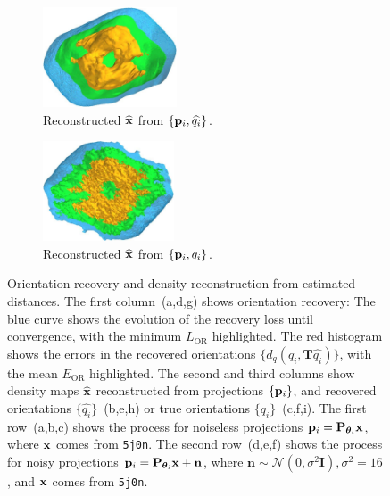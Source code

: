 \begin{figure}[t]
    \hfill
    \begin{subfigure}[b]{0.26\linewidth}
        \centering
        \includegraphics[height=8em]{figures/5a1a_aligned}
        \caption{Reconstructed $\widehat{\mathbf{x}}$ from $\{ \mathbf{p}_i, \widehat{q_i} \}$.}%
        \label{fig:5a1a-noise0-reconstruction-recovered}
    \end{subfigure}
    \hfill
    \begin{subfigure}[b]{0.26\linewidth}
        \centering
        \includegraphics[height=8em]{figures/5a1a_ground_truth}
        \caption{Reconstructed $\widehat{\mathbf{x}}$ from $\{ \mathbf{p}_i, q_i \}$.}%
        \label{fig:5a1a-noise0-reconstruction-true}
    \end{subfigure}
    \caption{%
        Orientation recovery and density reconstruction from estimated distances.
        The first column~(a,d,g) shows orientation recovery:
        The blue curve shows the evolution of the recovery loss until convergence, with the minimum $L_\text{OR}$  highlighted.
        The red histogram shows the errors in the recovered orientations $\{d_q(q_i, \mathbf{T}\widehat{q_i})\}$, with the mean $E_\text{OR}$  highlighted.
    The second and third columns show density maps $\widehat{\mathbf{x}}$ reconstructed from projections $\{ \mathbf{p}_i \}$, and recovered orientations $\{ \widehat{q_i} \}$~(b,e,h) or true orientations $\{ q_i \}$~(c,f,i).
        The first row~(a,b,c) shows the process for noiseless projections $\mathbf{p}_i = \mathbf{P}_{{\boldsymbol{\theta}}_i} \mathbf{x}$, where $\mathbf{x}$ comes from \texttt{5j0n}.
        The second row~(d,e,f) shows the process for noisy projections $\mathbf{p}_i = \mathbf{P}_{{\boldsymbol{\theta}}_i} \mathbf{x} + \mathbf{n}$, where $\mathbf{n} \sim \mathcal{N}(0, \sigma^2\mathbf{I}), \sigma^2=16$, and $\mathbf{x}$ comes from \texttt{5j0n}.
}
\end{figure}
